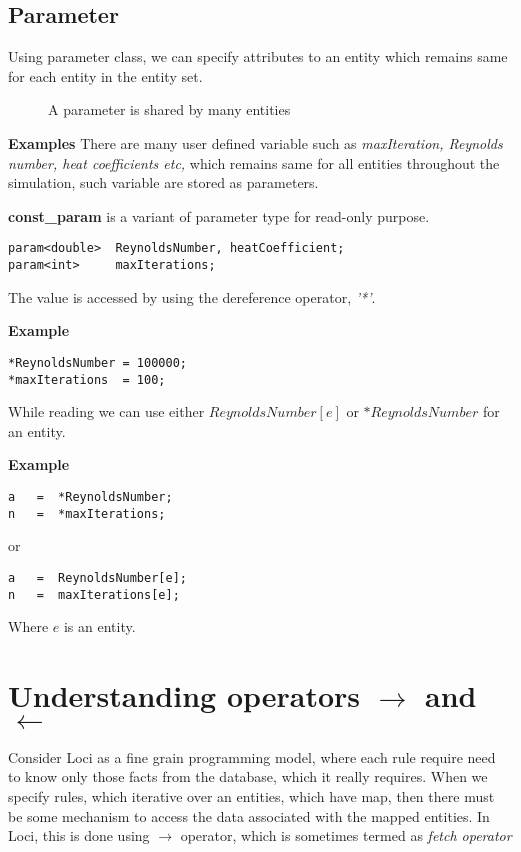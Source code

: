 \subsection{Parameter}
Using parameter class, we can specify attributes to an entity which
remains same for each entity in the entity set.
%
\begin{figure}[hp]
\vspace{1.8in}\caption { A parameter is shared by many entities }
\label{FigParameter}
\end{figure}
%
\par {\bf Examples } There are many user defined variable such as {\em maxIteration,
Reynolds number, heat coefficients etc,} which remains same for all entities
throughout the simulation, such variable are stored as parameters.
\par {\bf const\_param } is a variant of parameter type for read-only purpose.
\begin{verbatim}
param<double>  ReynoldsNumber, heatCoefficient;
param<int>     maxIterations;
\end{verbatim}
The value is accessed by using the dereference operator, {\em'*'}.
\par {\bf Example }
\begin{verbatim}
*ReynoldsNumber = 100000;
*maxIterations  = 100;
\end{verbatim}

\par While reading we can use either $ReynoldsNumber[e]$ or $*ReynoldsNumber$ for an entity.
\par {\bf Example }
\begin{verbatim}
a   =  *ReynoldsNumber;
n   =  *maxIterations;
\end{verbatim}
or
\begin{verbatim}
a   =  ReynoldsNumber[e];
n   =  maxIterations[e];
\end{verbatim}
\par Where $e$ is an entity.

\section { Understanding operators $\rightarrow$ and $\leftarrow$ }
Consider Loci as a fine grain programming model, where each rule require need to 
know only those facts from the database, which it really requires. When we specify
rules, which iterative over an entities, which have map, then there must be 
some mechanism to access the data associated with the mapped entities. In Loci,
this is done using $\rightarrow$ operator, which is sometimes termed as {\em fetch
operator}

